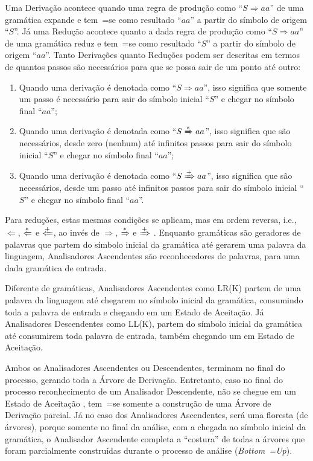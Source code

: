 Uma Derivação acontece quando uma regra de produção como ``$S \Rightarrow a a $'' de uma gramática expande e
tem~=se como resultado ``$a a$'' a partir do símbolo de origem ``$S$''.
Já uma Redução acontece quanto a dada regra de produção como ``$S \Rightarrow a a $'' de uma gramática reduz e
tem~=se como resultado ``$S$'' a partir do símbolo de origem ``$a a$''.
Tanto Derivações quanto Reduções podem ser descritas em termos de quantos passos são necessários para que se possa sair de um ponto até outro:
\begin{enumerate}%
    \item Quando uma derivação é denotada como ``$S \Rightarrow a a $'',
    isso significa que somente um passo é necessário para sair do símbolo inicial ``$S$'' e
    chegar no símbolo final ``$a a$'';
    \item Quando uma derivação é denotada como ``$S \xRightarrow{*} a a $'',
    isso significa que são necessários,
    desde zero (nenhum) até infinitos passos para sair do símbolo inicial ``$S$'' e
    chegar no símbolo final ``$a a$'';
    \item Quando uma derivação é denotada como ``$S \xRightarrow{+} a a $'',
    isso significa que são necessários,
    desde um passo até infinitos passos para sair do símbolo inicial ``$S$'' e
    chegar no símbolo final ``$a a$''.
\end{enumerate}

Para reduções,
estas mesmas condições se aplicam,
mas em ordem reversa,
i.e., $\Leftarrow$, $\xLeftarrow{*}$ e $\xLeftarrow{+}$,
ao invés de $\Rightarrow$,
$\xRightarrow{*}$ e
$\xRightarrow{+}$ \cite{ahoCompilerDragonBook}.
Enquanto gramáticas são geradores de palavras que partem do símbolo inicial da gramática até gerarem uma palavra da linguagem,
Analisadores Ascendentes são reconhecedores de palavras,
para uma dada gramática de entrada.

Diferente de gramáticas,
Analisadores Ascendentes como LR(K) partem de uma palavra da linguagem até chegarem no símbolo inicial da gramática,
consumindo toda a palavra de entrada e
chegando em um Estado de Aceitação.
Já Analisadores Descendentes como LL(K),
partem do símbolo inicial da gramática até consumirem toda palavra de entrada,
também chegando um em Estado de Aceitação.

Ambos os Analisadores Ascendentes ou
Descendentes,
terminam no final do processo,
gerando toda a Árvore de Derivação.
Entretanto,
caso no final do processo reconhecimento de um Analisador Descendente,
não se chegue em um Estado de Aceitação \cite{ahoCompilerDragonBook},
tem~=se somente a construção de uma Árvore de Derivação parcial.
Já no caso dos Analisadores Ascendentes,
será uma floresta (de árvores),
porque somente no final da análise,
com a chegada ao símbolo inicial da gramática,
o Analisador Ascendente completa a ``costura'' de todas a árvores que foram parcialmente construídas durante o processo de análise (\textit{Bottom~=Up}).

